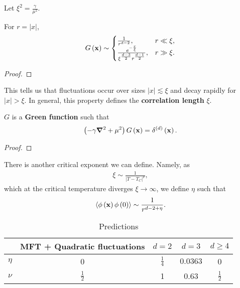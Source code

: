 Let $\xi^2 = \frac{\gamma}{\mu^2}$. 

\begin{claim}
    For $r = \left| x \right| $,
    \begin{align}
        G \left( \vb{x} \right) \sim  \begin{cases}
            \frac{1}{r^{d-2}}, & r \ll \xi, \\
            \frac{e^{-\frac{r}{\xi}}}{\xi^{\frac{d-3}{2}}r^{\frac{d-1}{2}}}, & r \gg \xi.
        \end{cases}
    \end{align}
\end{claim}

\begin{proof}
    
\end{proof}

This tells us that fluctuations occur over sizes $\left| x \right| \lesssim \xi$ and decay rapidly for $\left| x \right| > \xi$. In general, this property defines the \textbf{correlation length} $\xi$.

\begin{claim}
    $G$ is a \textbf{Green function} such that
    \begin{align}
        \left( -\gamma \grad^2 + \mu^2 \right) G\left( \vb{x} \right) = \delta^{\left( d \right) }\left( \vb{x} \right) 
    .\end{align}
\end{claim}

\begin{proof}
    
\end{proof}

There is another critical exponent we can define. Namely, as
\begin{align}
    \xi \sim  \frac{1}{\left| T - T_C \right|^{\nu}}
,\end{align}
which at the critical temperature diverges $\xi \to \infty$, we define $\eta$ such that
\begin{align}
    \left< \phi \left( \vb{x} \right) \phi \left( 0 \right)  \right> \sim  \frac{1}{r^{d-2+\eta}}
.\end{align}

\begin{table}[h]
    \centering
    \caption{Predictions}
    \begin{tabular}{ccccc}
     & MFT + Quadratic fluctuations & $d=2$ & $d = 3$ & $d \geq 4$ \\
     \midrule
        $\eta$ & 0 & $\frac{1}{4}$ & $0.0363$ & 0 \\
        $\nu$ & $\frac{1}{2}$ & 1 & 0.63 & $\frac{1}{2}$
    \end{tabular}
\end{table}

